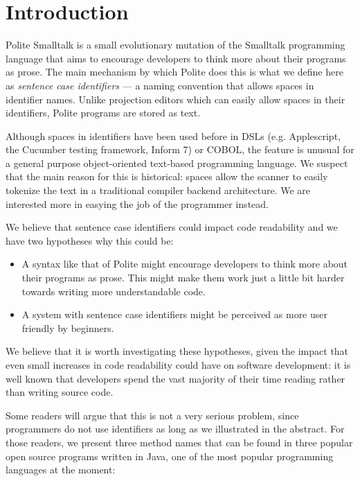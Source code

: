 

\section{Introduction}

Polite Smalltalk is a small evolutionary mutation of the Smalltalk programming language that aims to encourage developers to think more about their programs as prose. The main mechanism by which Polite does this is what we define here as {\em sentence case identifiers} --- a naming convention that allows spaces in identifier names. Unlike projection editors which can easily allow spaces in their identifiers, Polite programs are stored as text. 

Although spaces in identifiers have been used before in DSLs (e.g. Applescript, the Cucumber testing framework, Inform 7) or COBOL, the feature is unusual for a general purpose object-oriented text-based programming language. We suspect that the main reason for this is historical: spaces allow the scanner to easily tokenize the text in a traditional compiler backend architecture. We are interested more in easying the job of the programmer instead.


We believe that sentence case identifiers could impact code readability and we have two hypotheses why this could be: 

\begin{itemize}

	\item A syntax like that of Polite might encourage developers to think more about their programs as prose. This might make them work just a little bit harder towards writing more understandable code. 

	\item A system with sentence case identifiers might be perceived as more user friendly by beginners.

\end{itemize}

We believe that it is worth investigating these hypotheses, given the impact that even small increases in code readability could have on software development: it is well known that developers spend the vast majority of their time reading rather than writing source code.


Some readers will argue that this is not a very serious problem, since programmers do not use identifiers as long as we illustrated in the abstract. For those readers, we present three method names that can be found in three popular open source programs written in Java, one of the most popular programming languages at the moment: 


